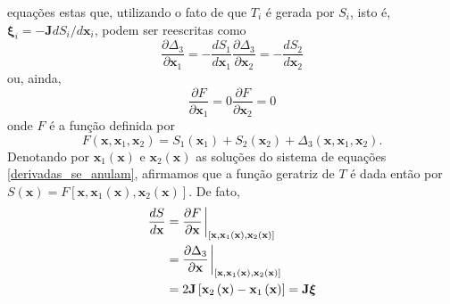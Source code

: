 \documentclass[
	12pt,
	oneside,			%
	a4paper,			%
	english,			%
	brazil				%
	]{abntex2}
\theoremstyle{definition}
\begin{document}
equações estas que, utilizando o fato de que $T_i$ é gerada por $S_i$, isto é, $\boldsymbol{\xi}_i = -\mathbf{J} d S_i /d \mathbf{x}_i$, podem ser reescritas como
\begin{subequations}
    \begin{equation}
        \frac{\partial \Delta_3}{\partial \mathbf{x}_1} = - \frac{d S_1}{d \mathbf{x}_1}
    \end{equation}
    \begin{equation}
        \frac{\partial \Delta_3}{\partial \mathbf{x}_2} =  - \frac{d S_2}{d \mathbf{x}_2}
    \end{equation}
\end{subequations}
ou, ainda,
\begin{subequations}
    \label{derivadas_se_anulam}
    \begin{equation}
        \frac{\partial F}{\partial \mathbf{x}_1} = 0
    \end{equation}
    \begin{equation}
        \frac{\partial F}{\partial \mathbf{x}_2} = 0
    \end{equation}
\end{subequations}
onde $F$ é a função definida por
\begin{equation}
    F(\mathbf{x},\mathbf{x}_1,\mathbf{x}_2) = S_1\left(\mathbf{x}_1\right) + S_2\left(\mathbf{x}_2\right) + \Delta_3 (\mathbf{x},\mathbf{x}_1,\mathbf{x}_2).
\end{equation}
Denotando por $\mathbf{x}_1 \left( \mathbf{x} \right)$ e $\mathbf{x}_2 \left( \mathbf{x} \right)$ as soluções do sistema de equações \eqref{derivadas_se_anulam}, afirmamos que a função geratriz de $T$ é dada então por $S(\mathbf{x}) = F\left[\mathbf{x},\mathbf{x}_1 \left(\mathbf{x}\right),\mathbf{x}_2 \left(\mathbf{x}\right)\right]$. De fato,
\begin{equation}
    \begin{aligned}
        \frac{d S}{d \mathbf{x}} &= \frac{\partial F}{\partial \mathbf{x}} \eval_{\left[ \mathbf{x}, \mathbf{x}_1 \left(\mathbf{x}\right),\mathbf{x}_2 \left(\mathbf{x}\right)\right] }  \\ &= \frac{\partial \Delta_3}{\partial \mathbf{x}} \eval_{\left[ \mathbf{x}, \mathbf{x}_1 \left(\mathbf{x}\right),\mathbf{x}_2 \left(\mathbf{x}\right)\right] } \\ &= 2 \mathbf{J} \left[ \mathbf{x}_2 \left(\mathbf{x}\right) - \mathbf{x}_1 \left(\mathbf{x}\right) \right] = \mathbf{J} \boldsymbol{\xi}
    \end{aligned}
\end{equation}
\end{document}
